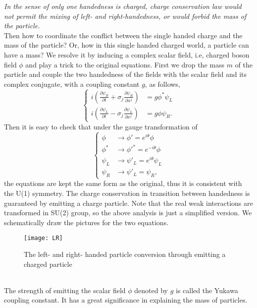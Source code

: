 \documentclass{article}
\newcommand{\be}{\begin{equation}}
\newcommand{\ee}{\end{equation}}
\newcommand{\p}{\partial}
\renewcommand{\1}{\left}
\renewcommand{\2}{\right}
\newcommand{\sig}{\sigma}
\renewcommand{\th}{\theta}
\begin{document}
\textit{In the sense of only one handedness is charged, charge conservation law would not permit the mixing of left- and right-handedness, or would forbid the mass of the particle.}\\

Then how to coordinate the conflict between the single handed charge and the mass of the particle? Or, how in this single handed charged world, a particle can have a mass? We resolve it by inducing a complex scalar field, i.e, charged boson field $\phi$ and play a trick to the original equations. First we drop the mass $m$ of the particle and couple the two handedness of the fields with the scalar field and its complex conjugate, with a coupling constant $g$, as follows,
\be\1\{\begin{split}
i\1(\frac{\p\psi_R}{\p t}+\sig_j\frac{\p\psi_R}{\p x^j}\2)&=g\phi^*\psi_L\\
i\1(\frac{\p\psi_L}{\p t}-\sig_j\frac{\p\psi_L}{\p x^j}\2)&=g\phi\psi_R.
\end{split}\2.\ee
Then it is easy to check that under the gauge transformation of
\be\1\{\begin{split}
\phi &\rightarrow \phi'=e^{i\th}\phi\\
\phi^* &\rightarrow \phi'^*=e^{-i\th}\phi\\
\psi_L &\rightarrow \psi'_L=e^{i\th}\psi_L\\
\psi_R &\rightarrow \psi'_L=\psi_R,
\end{split}\2.\ee
the equations are kept the same form as the original, thus it is consistent with the U(1) symmetry. The charge conservation in transition between handedness is guaranteed by emitting a charge particle. Note that the real weak interactions are transformed in SU(2) group, so the above analysis is just a simplified version. We schematically draw the pictures for the two equations.
\begin{figure}[h]
\centering
\texttt{[image: LR]}
\caption{The left- and right- handed particle conversion through emitting a charged particle}
\end{figure}\\
The strength of emitting the scalar field $\phi$ denoted by $g$ is called the Yukawa coupling constant. It has a great significance in explaining the mass of particles.\\
\end{document}
